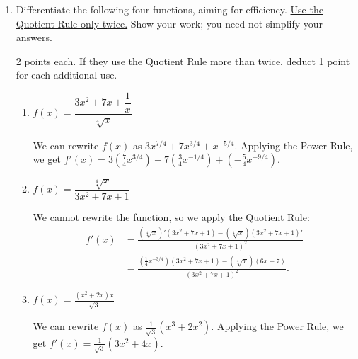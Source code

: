 \documentclass{article}
\begin{document}
\begin{enumerate}
\begin{enumerate}
  \item
    Differentiate the following four functions, aiming for efficiency. \uline{Use the Quotient Rule only twice.} Show your work; you need not simplify your answers.

    \begin{grading}
      2 points each. If they use the Quotient Rule more than twice, deduct 1 point for each additional use.
    \end{grading}

    \begin{enumerate}
    \item
      \begin{problem}[\vfill]
        $f(x) = \dfrac{3x^2 + 7x + \dfrac{1}{x}}{\sqrt[4]{x}}$
      \end{problem}

      \begin{solution}
        We can rewrite $f(x)$ as $3x^{7/4} + 7x^{3/4} + x^{-5/4}$.
        Applying the Power Rule, we get $f'(x) = 3(\tfrac{7}{4}x^{3/4}) 
        + 7(\tfrac{3}{4}x^{-1/4}) + (-\tfrac{5}{4}x^{-9/4}).$
      \end{solution}    

    \item
      \begin{problem}[\vfill]
        $f(x) = \dfrac{\sqrt[4]{x}}{3x^2 + 7x + 1}$
      \end{problem}

      \begin{solution}
        We cannot rewrite the function, so we apply the Quotient Rule:
        \begin{align*}
          f'(x) &= 
          \frac{(\sqrt[4]{x})'(3x^2 + 7x + 1) - (\sqrt[4]{x})(3x^2 + 7x + 1)'}
          {(3x^2 + 7x + 1)^2} \\
          &= \frac{(\tfrac{1}{4}x^{-3/4})(3x^2 + 7x + 1) - (\sqrt[4]{x})(6x+7)}
          {(3x^2 + 7x + 1)^2}.
        \end{align*}
      \end{solution}

    \item
      \begin{problem}[\vfill]
        $f(x) = \displaystyle \frac{(x^2 + 2x)x}{\sqrt{3}}$
      \end{problem}

      \begin{solution}
        We can rewrite $f(x)$ as $\tfrac{1}{\sqrt{3}}(x^3+2x^2)$. Applying the
        Power Rule, we get $f'(x) = \tfrac{1}{\sqrt{3}} (3x^2 + 4x)$.
      \end{solution}


\end{enumerate}
\end{enumerate}
\end{enumerate}
\end{document}
